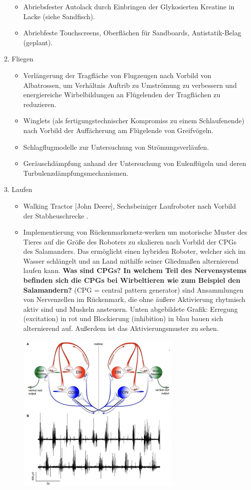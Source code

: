\begin{enumerate}
\begin{itemize}
        \item Abriebsfester Autolack durch Einbringen der Glykosierten Kreatine in Lacke (siehe Sandfisch).
        \item Abriebfeste Touchscreens, Oberflächen für Sandboards, Antistatik-Belag (geplant).
    \end{itemize}
    \item Fliegen
    \begin{itemize}
        \item Verlängerung der Tragfläche von Flugzeugen nach Vorbild von Albatrossen, um Verhältnis Auftrib zu Umströmung zu verbessern und energiereiche Wirbelbildungen an Flügelenden der Tragflächen zu reduzieren.
        \item Winglets (als fertigungstechnischer Kompromiss zu einem Schlaufenende) nach Vorbild der Auffächerung am Flügelende von Greifvögeln.
        \item Schlagflugmodelle zur Untersuchung von Strömungsverläufen.
        \item Geräuschdämpfung anhand der Untersuchung von Eulenflügeln und deren Turbulenzdämpfungsmechanismen.
    \end{itemize}
    \item Laufen
    \begin{itemize}
        \item Walking Tractor [John Deere], Sechsbeiniger Laufroboter nach Vorbild der Stabheuschrecke \dangersign.
        \item Implementierung von Rückenmarksnetz-werken um motorische Muster des Tieres auf die Größe des Roboters zu skalieren nach Vorbild der CPGs des Salamanders. Das ermöglicht einen hybriden Roboter, welcher sich im Wasser schlängelt und an Land mithilfe seiner Gliedmaßen alternierend laufen kann. \dangersign \textbf{Was sind CPGs? In welchem Teil des Nervensystems
        befinden sich die CPGs bei Wirbeltieren wie zum Beispiel den Salamandern?} (CPG = central pattern generator) sind Ansammlungen von Nervenzellen im Rückenmark, die ohne äußere Aktivierung rhytmisch aktiv sind und Muskeln ansteuern. Unten abgebildete Grafik: Erregung (excitation) in rot und Blockierung (inhibition) in blau bauen sich alternierend auf. Außerdem ist das Aktivierungsmuster zu sehen.
        \begin{center}
            \includegraphics[width=8cm]{lec9/figures/cpg.png}

\end{center}
\end{itemize}
\end{enumerate}
